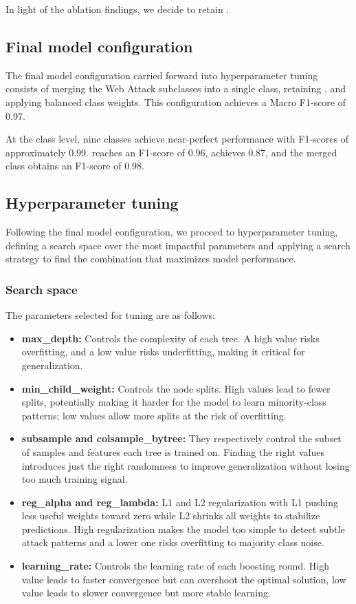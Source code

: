 In light of the ablation findings, we decide to retain .

\subsection{Final model configuration}
The final model configuration carried forward into hyperparameter tuning consists of merging the Web Attack subclasses into a single class, retaining , and applying balanced class weights. This configuration achieves a Macro F1-score of 0.97.

At the class level, nine classes achieve near-perfect performance with F1-scores of approximately 0.99.  reaches an F1-score of 0.96,  achieves 0.87, and the merged  class obtains an F1-score of 0.98.

\subsection{Hyperparameter tuning}

Following the final model configuration, we proceed to hyperparameter tuning, defining a search space over the most impactful parameters and applying a search strategy to find the combination that maximizes model performance.

\subsubsection{Search space}

The parameters selected for tuning are as follows:

\begin{itemize}
    \item \textbf{max\_depth:} Controls the complexity of each tree. A high value risks overfitting, and a low value risks underfitting, making it critical for generalization.
    \item \textbf{min\_child\_weight:} Controls the node splits. High values lead to fewer splits, potentially making it harder for the model to learn minority-class patterns; low values allow more splits at the risk of overfitting.
    \item \textbf{subsample and colsample\_bytree:} They respectively control the subset of samples and features each tree is trained on. Finding the right values introduces just the right randomness to improve generalization without losing too much training signal.
    \item \textbf{reg\_alpha and reg\_lambda:} L1 and L2 regularization with L1 pushing less useful weights toward zero while L2 shrinks all weights to stabilize predictions. High regularization makes the model too simple to detect subtle attack patterns and a lower one risks overfitting to majority class noise.
    \item \textbf{learning\_rate:} Controls the learning rate of each boosting round. High value leads to faster convergence but can overshoot the optimal solution, low value leads to slower convergence but more stable learning.
\end{itemize}

